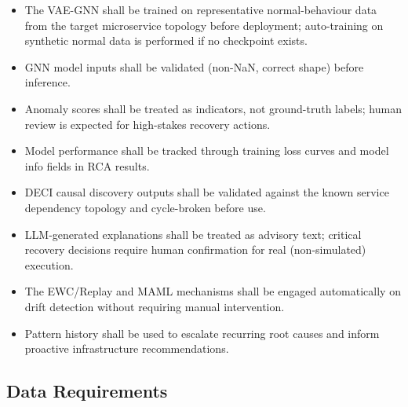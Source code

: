 \documentclass[11pt,a4paper]{article}
\begin{document}
\begin{itemize}
    \item The VAE-GNN shall be trained on representative normal-behaviour data from the target microservice topology before deployment; auto-training on synthetic normal data is performed if no checkpoint exists.
    \item GNN model inputs shall be validated (non-NaN, correct shape) before inference.
    \item Anomaly scores shall be treated as indicators, not ground-truth labels; human review is expected for high-stakes recovery actions.
    \item Model performance shall be tracked through training loss curves and model info fields in RCA results.
    \item DECI causal discovery outputs shall be validated against the known service dependency topology and cycle-broken before use.
    \item LLM-generated explanations shall be treated as advisory text; critical recovery decisions require human confirmation for real (non-simulated) execution.
    \item The EWC/Replay and MAML mechanisms shall be engaged automatically on drift detection without requiring manual intervention.
    \item Pattern history shall be used to escalate recurring root causes and inform proactive infrastructure recommendations.
\end{itemize}


\subsection{Data Requirements}
\end{document}
